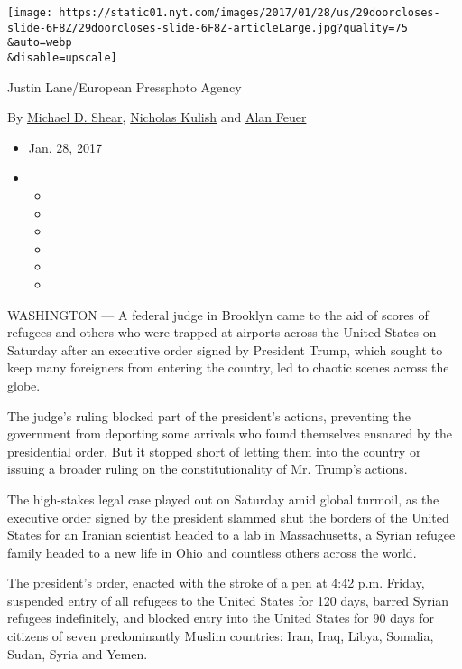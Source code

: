 \texttt{[image: https://static01.nyt.com/images/2017/01/28/us/29doorcloses-slide-6F8Z/29doorcloses-slide-6F8Z-articleLarge.jpg?quality=75\\\&auto=webp\\\&disable=upscale]}

Justin Lane/European Pressphoto Agency

By \href{http://www.nytimes.com/by/michael-d-shear}{Michael D. Shear},
\href{http://www.nytimes.com/by/nicholas-kulish}{Nicholas Kulish} and
\href{http://www.nytimes.com/by/alan-feuer}{Alan Feuer}

\begin{itemize}
\item
  Jan. 28, 2017
\item
  \begin{itemize}
  \item
  \item
  \item
  \item
  \item
  \item
  \end{itemize}
\end{itemize}

WASHINGTON --- A federal judge in Brooklyn came to the aid of scores of
refugees and others who were trapped at airports across the United
States on Saturday after an executive order signed by President Trump,
which sought to keep many foreigners from entering the country, led to
chaotic scenes across the globe.

The judge's ruling blocked part of the president's actions, preventing
the government from deporting some arrivals who found themselves
ensnared by the presidential order. But it stopped short of letting them
into the country or issuing a broader ruling on the constitutionality of
Mr. Trump's actions.

The high-stakes legal case played out on Saturday amid global turmoil,
as the executive order signed by the president slammed shut the borders
of the United States for an Iranian scientist headed to a lab in
Massachusetts, a Syrian refugee family headed to a new life in Ohio and
countless others across the world.

The president's order, enacted with the stroke of a pen at 4:42 p.m.
Friday, suspended entry of all refugees to the United States for 120
days, barred Syrian refugees indefinitely, and blocked entry into the
United States for 90 days for citizens of seven predominantly Muslim
countries: Iran, Iraq, Libya, Somalia, Sudan, Syria and Yemen.

